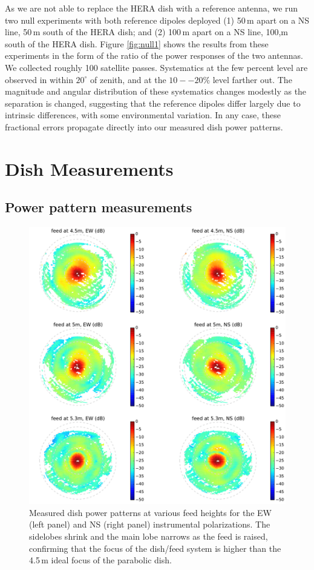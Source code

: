 \documentclass{emulateapj}
\begin{document}
As we are not able to replace the HERA dish with a reference antenna, we run two null experiments with both reference dipoles deployed (1) 50\,m apart on a NS line, 50\,m south of the HERA dish; and (2) 100\,m apart on a NS line, 100,m south of the HERA dish. Figure \ref{fig:null1} shows the  results from these experiments in the form of the ratio of the power responses of the two antennas. We collected roughly 100 satellite passes. Systematics at the few percent level are observed in  within $20^\circ$ of zenith, and at the $10--20\%$ level farther out. The magnitude and angular distribution of these systematics changes modestly as the separation is changed, suggesting that the reference dipoles differ largely due to intrinsic differences, with some environmental variation. In any case, these fractional errors propagate directly into our measured dish power patterns.

\section{Dish Measurements}

\subsection{Power pattern measurements}

\begin{figure}[t]
\centering
\includegraphics[width=6.5in]{measured_beams_and_models_maps.pdf}
\caption{Measured dish power patterns at various feed heights for the EW (left panel) and NS (right panel) instrumental polarizations. The sidelobes shrink and the main lobe narrows as the feed is raised, confirming that the focus of the dish/feed system is higher than the 4.5\,m ideal focus of the parabolic dish.}
\label{fig:measuredbeammaps}
\end{figure}
\end{document}

